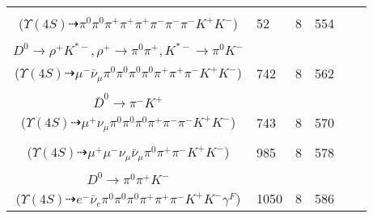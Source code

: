 \documentclass[landscape]{article}
\newcounter{rownumbers}
\newcommand\rn{\stepcounter{rownumbers}\arabic{rownumbers}}
\newcommand{\EOLP}{\\ \hline} %
\newcommand{\topoTags}[1]{#1} %
\begin{document}
\begin{longtable}{clcccc}
\rn & \makecell[l]{ $ 
\Upsilon(4S) \rightarrow B^{+} B^{-} ,
B^{+} \rightarrow \rho^{+} \bar{D}^{0} ,
B^{-} \rightarrow \pi^{+} \pi^{-} \pi^{-} D^{0} ,
\rho^{+} \rightarrow \pi^{0} \pi^{+} ,
\bar{D}^{0} \rightarrow \pi^{-} K^{+} ,
D^{0} \rightarrow \pi^{0} \pi^{+} K^{-} 
$ \\ ($
\Upsilon(4S) \dashrightarrow \pi^{0} \pi^{0} \pi^{+} \pi^{+} \pi^{+} \pi^{-} \pi^{-} \pi^{-} K^{+} K^{-} 
$) } & \topoTags{52 & }8 & 554 \EOLP

\rn & \makecell[l]{ $ 
\Upsilon(4S) \rightarrow B^{+} B^{-} ,
B^{+} \rightarrow \rho^{+} \bar{D}^{0} ,
B^{-} \rightarrow \mu^{-} \bar{\nu}_{\mu} D^{*0} ,
\rho^{+} \rightarrow \pi^{0} \pi^{+} ,
\bar{D}^{0} \rightarrow \pi^{-} K^{+} ,
D^{*0} \rightarrow \pi^{0} D^{0} ,
$ \\ $
D^{0} \rightarrow \rho^{+} K^{*-} ,
\rho^{+} \rightarrow \pi^{0} \pi^{+} ,
K^{*-} \rightarrow \pi^{0} K^{-} 
$ \\ ($
\Upsilon(4S) \dashrightarrow \mu^{-} \bar{\nu}_{\mu} \pi^{0} \pi^{0} \pi^{0} \pi^{0} \pi^{+} \pi^{+} \pi^{-} K^{+} K^{-} 
$) } & \topoTags{742 & }8 & 562 \EOLP

\rn & \makecell[l]{ $ 
\Upsilon(4S) \rightarrow B^{+} B^{-} ,
B^{+} \rightarrow \mu^{+} \nu_{\mu} \bar{D}^{*0} ,
B^{-} \rightarrow \rho^{-} D^{0} ,
\bar{D}^{*0} \rightarrow \pi^{0} \bar{D}^{0} ,
\rho^{-} \rightarrow \pi^{0} \pi^{-} ,
D^{0} \rightarrow \pi^{0} \pi^{+} K^{-} ,
$ \\ $
\bar{D}^{0} \rightarrow \pi^{-} K^{+} 
$ \\ ($
\Upsilon(4S) \dashrightarrow \mu^{+} \nu_{\mu} \pi^{0} \pi^{0} \pi^{0} \pi^{+} \pi^{-} \pi^{-} K^{+} K^{-} 
$) } & \topoTags{743 & }8 & 570 \EOLP

\rn & \makecell[l]{ $ 
\Upsilon(4S) \rightarrow B^{+} B^{-} ,
B^{+} \rightarrow \rho^{+} \bar{D}^{0} ,
B^{-} \rightarrow \mu^{-} \bar{\nu}_{\mu} D^{0} ,
\rho^{+} \rightarrow \pi^{0} \pi^{+} ,
\bar{D}^{0} \rightarrow \pi^{-} K^{+} ,
D^{0} \rightarrow \mu^{+} \nu_{\mu} K^{-} 
$ \\ ($
\Upsilon(4S) \dashrightarrow \mu^{+} \mu^{-} \nu_{\mu} \bar{\nu}_{\mu} \pi^{0} \pi^{+} \pi^{-} K^{+} K^{-} 
$) } & \topoTags{985 & }8 & 578 \EOLP

\rn & \makecell[l]{ $ 
\Upsilon(4S) \rightarrow B^{+} B^{-} ,
B^{+} \rightarrow \rho^{+} \bar{D}^{0} ,
B^{-} \rightarrow e^{-} \bar{\nu}_{e} D^{*0} ,
\rho^{+} \rightarrow \pi^{0} \pi^{+} ,
\bar{D}^{0} \rightarrow \pi^{-} K^{+} \gamma^{F} ,
D^{*0} \rightarrow \pi^{0} D^{0} ,
$ \\ $
D^{0} \rightarrow \pi^{0} \pi^{+} K^{-} 
$ \\ ($
\Upsilon(4S) \dashrightarrow e^{-} \bar{\nu}_{e} \pi^{0} \pi^{0} \pi^{0} \pi^{+} \pi^{+} \pi^{-} K^{+} K^{-} \gamma^{F} 
$) } & \topoTags{1050 & }8 & 586 \EOLP


\end{longtable}
\end{document}
